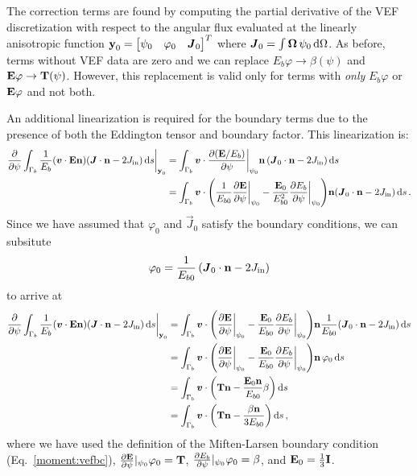 \documentclass[../doc.tex]{subfiles}
\begin{document}
The correction terms are found by computing the partial derivative of the VEF discretization with respect to the angular flux evaluated at the linearly anisotropic function $\boldsymbol{\mathrm{y}}_0 = \begin{bmatrix} \psi_0 & \varphi_0 & \boldsymbol{J}_0 \end{bmatrix}^T$ where $\boldsymbol{J}_0 = \int \boldsymbol{\Omega}\,\psi_0 \mathop{}\!\mathrm{d} \Omega$. As before, terms without VEF data are zero and we can replace $E_b\varphi \rightarrow \beta(\psi)$ and $\boldsymbol{\mathrm{E}}\varphi \rightarrow \boldsymbol{\mathrm{T}}(\psi)$. However, this replacement is valid only for terms with \emph{only} $E_b\varphi$ or $\boldsymbol{\mathrm{E}}\varphi$ and not both. 

An additional linearization is required for the boundary terms due to the presence of both the Eddington tensor and boundary factor. This linearization is: 
	\begin{equation}
	\begin{aligned}
		\frac{\partial }{\partial \psi}\int_{\Gamma_b} \frac{1}{E_b}\!\left( \boldsymbol{v}\cdot\boldsymbol{\mathrm{E}}\boldsymbol{\mathrm{n}} \right)\!\left( \boldsymbol{J}\cdot\boldsymbol{\mathrm{n}} - 2J_\text{in} \right) \mathop{}\!\mathrm{d} s \biggr\rvert_{\boldsymbol{\mathrm{y}}_0} &= \int_{\Gamma_b} \boldsymbol{v}\cdot\frac{\partial (\boldsymbol{\mathrm{E}}/E_b)}{\partial \psi}\biggr\rvert_{\psi_0}\boldsymbol{\mathrm{n}}\left( \boldsymbol{J}_0\cdot\boldsymbol{\mathrm{n}} - 2J_\text{in} \right) \mathop{}\!\mathrm{d} s \\
		&= \int_{\Gamma_b} \boldsymbol{v} \cdot \left( \frac{1}{E_{b0}}\frac{\partial \boldsymbol{\mathrm{E}}}{\partial \psi}\biggr\rvert_{\psi_0} - \frac{\boldsymbol{\mathrm{E}}_0}{E_{b0}^2}\frac{\partial E_b}{\partial \psi}\biggr\rvert_{\psi_0} \right)\!\boldsymbol{\mathrm{n}}\!\left( \boldsymbol{J}_0\cdot\boldsymbol{\mathrm{n}} - 2J_\text{in} \right) \mathop{}\!\mathrm{d} s \,. 
	\end{aligned}
	\end{equation}
Since we have assumed that $\varphi_0$ and $\vec{J}_0$ satisfy the boundary conditions, we can subsitute 
	\begin{equation}
		\varphi_0 = \frac{1}{E_{b0}}\left( \boldsymbol{J}_0\cdot\boldsymbol{\mathrm{n}} - 2J_\text{in} \right) 
	\end{equation}
to arrive at 
	\begin{equation}
	\begin{aligned}
		\pderiv{}{\psi}\int_{\Gamma_b} \frac{1}{E_b}\!\paren{\vec{v}\cdot\E\n}\!\paren{\vec{J}\cdot\n - 2\Jin} \ud s \biggr\rvert_{\y_0} &= \int_{\Gamma_b} \vec{v}\cdot\paren{\pderiv{\E}{\psi}\biggr\rvert_{\psi_0} - \frac{\E_0}{E_{b0}} \pderiv{E_b}{\psi}\biggr\rvert_{\psi_0}}\!\n \frac{1}{E_{b0}}\!\paren{\vec{J}_0\cdot\n - 2\Jin} \ud s \\
		&= \int_{\Gamma_b} \vec{v}\cdot\paren{\pderiv{\E}{\psi}\biggr\rvert_{\psi_0} - \frac{\E_0}{E_{b0}} \pderiv{E_b}{\psi}\biggr\rvert_{\psi_0}}\!\n\,\varphi_0 \ud s \\
		&= \int_{\Gamma_b} \vec{v}\cdot\paren{\T\n - \frac{\E_0\n}{E_{b0}}\beta} \ud s \\
		&= \int_{\Gamma_b} \vec{v}\cdot\paren{\T\n - \frac{\beta\n}{3E_{b0}}} \ud s \,, 
	\end{aligned}
	\end{equation}
where we have used the definition of the Miften-Larsen boundary condition (Eq.~\ref{moment:vefbc}), $\frac{\partial \boldsymbol{\mathrm{E}}}{\partial \psi}\rvert_{\psi_0}\varphi_0 = \boldsymbol{\mathrm{T}}$, $\frac{\partial E_b}{\partial \psi}\rvert_{\psi_0}\varphi_0 = \beta$, and $\boldsymbol{\mathrm{E}}_0 = \frac{1}{3}\boldsymbol{\mathrm{I}}$. 
\end{document}
